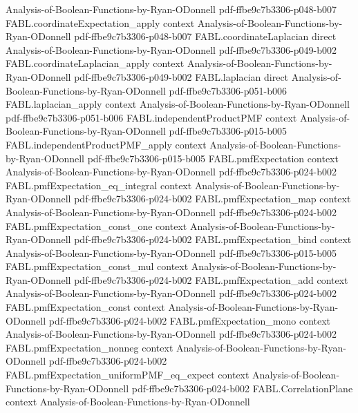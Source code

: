 \begin{theorem}
  {Analysis-of-Boolean-Functions-by-Ryan-ODonnell}
  {pdf-ffbe9c7b3306-p048-b007}
\proofstep
  {FABL.coordinateExpectation_apply}
  {context}
  {Analysis-of-Boolean-Functions-by-Ryan-ODonnell}
  {pdf-ffbe9c7b3306-p048-b007}
\proofstep
  {FABL.coordinateLaplacian}
  {direct}
  {Analysis-of-Boolean-Functions-by-Ryan-ODonnell}
  {pdf-ffbe9c7b3306-p049-b002}
\proofstep
  {FABL.coordinateLaplacian_apply}
  {context}
  {Analysis-of-Boolean-Functions-by-Ryan-ODonnell}
  {pdf-ffbe9c7b3306-p049-b002}
\proofstep
  {FABL.laplacian}
  {direct}
  {Analysis-of-Boolean-Functions-by-Ryan-ODonnell}
  {pdf-ffbe9c7b3306-p051-b006}
\proofstep
  {FABL.laplacian_apply}
  {context}
  {Analysis-of-Boolean-Functions-by-Ryan-ODonnell}
  {pdf-ffbe9c7b3306-p051-b006}
\proofstep
  {FABL.independentProductPMF}
  {context}
  {Analysis-of-Boolean-Functions-by-Ryan-ODonnell}
  {pdf-ffbe9c7b3306-p015-b005}
\proofstep
  {FABL.independentProductPMF_apply}
  {context}
  {Analysis-of-Boolean-Functions-by-Ryan-ODonnell}
  {pdf-ffbe9c7b3306-p015-b005}
\proofstep
  {FABL.pmfExpectation}
  {context}
  {Analysis-of-Boolean-Functions-by-Ryan-ODonnell}
  {pdf-ffbe9c7b3306-p024-b002}
\proofstep
  {FABL.pmfExpectation_eq_integral}
  {context}
  {Analysis-of-Boolean-Functions-by-Ryan-ODonnell}
  {pdf-ffbe9c7b3306-p024-b002}
\proofstep
  {FABL.pmfExpectation_map}
  {context}
  {Analysis-of-Boolean-Functions-by-Ryan-ODonnell}
  {pdf-ffbe9c7b3306-p024-b002}
\proofstep
  {FABL.pmfExpectation_const_one}
  {context}
  {Analysis-of-Boolean-Functions-by-Ryan-ODonnell}
  {pdf-ffbe9c7b3306-p024-b002}
\proofstep
  {FABL.pmfExpectation_bind}
  {context}
  {Analysis-of-Boolean-Functions-by-Ryan-ODonnell}
  {pdf-ffbe9c7b3306-p015-b005}
\proofstep
  {FABL.pmfExpectation_const_mul}
  {context}
  {Analysis-of-Boolean-Functions-by-Ryan-ODonnell}
  {pdf-ffbe9c7b3306-p024-b002}
\proofstep
  {FABL.pmfExpectation_add}
  {context}
  {Analysis-of-Boolean-Functions-by-Ryan-ODonnell}
  {pdf-ffbe9c7b3306-p024-b002}
\proofstep
  {FABL.pmfExpectation_const}
  {context}
  {Analysis-of-Boolean-Functions-by-Ryan-ODonnell}
  {pdf-ffbe9c7b3306-p024-b002}
\proofstep
  {FABL.pmfExpectation_mono}
  {context}
  {Analysis-of-Boolean-Functions-by-Ryan-ODonnell}
  {pdf-ffbe9c7b3306-p024-b002}
\proofstep
  {FABL.pmfExpectation_nonneg}
  {context}
  {Analysis-of-Boolean-Functions-by-Ryan-ODonnell}
  {pdf-ffbe9c7b3306-p024-b002}
\proofstep
  {FABL.pmfExpectation_uniformPMF_eq_expect}
  {context}
  {Analysis-of-Boolean-Functions-by-Ryan-ODonnell}
  {pdf-ffbe9c7b3306-p024-b002}
\proofstep
  {FABL.CorrelationPlane}
  {context}
  {Analysis-of-Boolean-Functions-by-Ryan-ODonnell}

\end{theorem}

